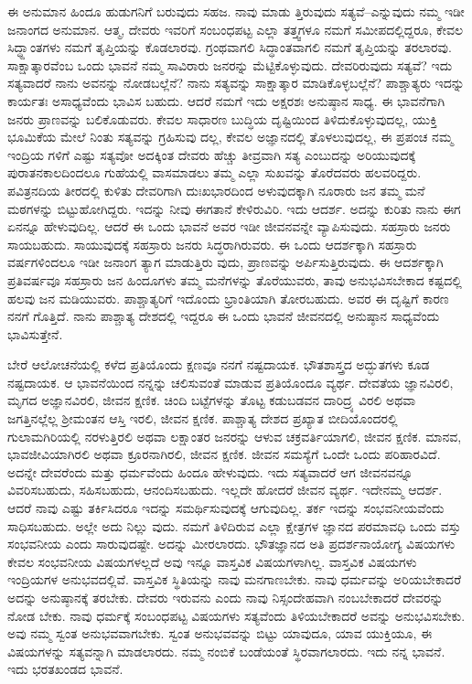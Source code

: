 ಈ ಅನುಮಾನ ಹಿಂದೂ ಹುಡುಗನಿಗೆ ಬರುವುದು ಸಹಜ. ನಾವು ಮಾಡು ತ್ತಿರುವುದು ಸತ್ಯವೆ–ಎನ್ನುವುದು ನಮ್ಮ ಇಡೀ ಜನಾಂಗದ ಅನುಮಾನ. ಆತ್ಮ, ದೇವರು ಇವರಿಗೆ ಸಂಬಂಧಪಟ್ಟ ಎಲ್ಲಾ ತತ್ತ್ವಗಳೂ ನಮಗೆ ಸಮೀಪದಲ್ಲಿದ್ದರೂ, ಕೇವಲ ಸಿದ್ಧ್ದಾಂತಗಳು ನಮಗೆ ತೃಪ್ತಿಯನ್ನು ಕೊಡಲಾರವು. ಗ್ರಂಥವಾಗಲಿ ಸಿದ್ಧಾಂತವಾಗಲಿ ನಮಗೆ ತೃಪ್ತಿಯನ್ನು ತರಲಾರವು. ಸಾಕ್ಷಾತ್ಕಾರವೆಂಬ ಒಂದು ಭಾವನೆ ನಮ್ಮ ಸಾವಿರಾರು ಜನರನ್ನು ಮೆಟ್ಟಿಕೊಳ್ಳುವುದು. ದೇವರಿರುವುದು ಸತ್ಯವೆ? ಇದು ಸತ್ಯವಾದರೆ ನಾನು ಅವನನ್ನು ನೋಡಬಲ್ಲೆನೆ? ನಾನು ಸತ್ಯವನ್ನು ಸಾಕ್ಷಾತ್ಕಾರ ಮಾಡಿಕೊಳ್ಳಬಲ್ಲೆನೆ? ಪಾಶ್ಚಾತ್ಯರು ಇದನ್ನು ಕಾರ್ಯತಃ ಅಸಾಧ್ಯವೆಂದು ಭಾವಿಸ ಬಹುದು. ಆದರೆ ನಮಗೆ ಇದು ಅಕ್ಷರಶಃ ಅನುಷ್ಠಾನ ಸಾಧ್ಯ. ಈ ಭಾವನೆಗಾಗಿ ಜನರು ಪ್ರಾಣವನ್ನು ಬಲಿಕೊಡುವರು. ಕೇವಲ ಸಾಧಾರಣ ಬುದ್ಧಿಯ ದೃಷ್ಟಿಯಿಂದ ತಿಳಿದುಕೊಳ್ಳುವುದಲ್ಲ, ಯುಕ್ತಿ ಭೂಮಿಕೆಯ ಮೇಲೆ ನಿಂತು ಸತ್ಯವನ್ನು ಗ್ರಹಿಸುವು ದಲ್ಲ, ಕೇವಲ ಅಜ್ಞಾನದಲ್ಲಿ ತೊಳಲುವುದಲ್ಲ, ಈ ಪ್ರಪಂಚ ನಮ್ಮ ಇಂದ್ರಿಯ ಗಳಿಗೆ ಎಷ್ಟು ಸತ್ಯವೋ ಅದಕ್ಕಿಂತ ದೇವರು ಹೆಚ್ಚು ತೀವ್ರವಾಗಿ ಸತ್ಯ ಎಂಬುದನ್ನು ಅರಿಯುವುದಕ್ಕೆ ಪುರಾತನಕಾಲದಿಂದಲೂ ಗುಹೆಯಲ್ಲಿ ವಾಸಮಾಡಲು ತಮ್ಮ ಎಲ್ಲಾ ಸುಖವನ್ನು ತೊರೆದವರು ಹಲವರಿದ್ದರು. ಪವಿತ್ರನದಿಯ ತೀರದಲ್ಲಿ ಕುಳಿತು ದೇವರಿಗಾಗಿ ದುಃಖಭಾರದಿಂದ ಅಳುವುದಕ್ಕಾಗಿ ನೂರಾರು ಜನ ತಮ್ಮ ಮನೆ ಮಠಗಳನ್ನು ಬಿಟ್ಟುಹೋಗಿದ್ದರು. ಇದನ್ನು ನೀವು ಈಗತಾನೆ ಕೇಳಿರುವಿರಿ. ಇದು ಆದರ್ಶ. ಅದನ್ನು ಕುರಿತು ನಾನು ಈಗ ಏನನ್ನೂ ಹೇಳುವುದಿಲ್ಲ. ಆದರೆ ಈ ಒಂದು ಭಾವನೆ ಅವರ ಇಡೀ ಜೀವನವನ್ನೇ ವ್ಯಾಪಿಸುವುದು. ಸಹಸ್ರಾರು ಜನರು ಸಾಯಬಹುದು. ಸಾಯುವುದಕ್ಕೆ ಸಹಸ್ರಾರು ಜನರು ಸಿದ್ಧರಾಗಿರುವರು. ಈ ಒಂದು ಆದರ್ಶಕ್ಕಾಗಿ ಸಹಸ್ರಾರು ವರ್ಷಗಳಿಂದಲೂ ಇಡೀ ಜನಾಂಗ ತ್ಯಾಗ ಮಾಡುತ್ತಿರು ವುದು, ಪ್ರಾಣವನ್ನು ಅರ್ಪಿಸುತ್ತಿರುವುದು. ಈ ಆದರ್ಶಕ್ಕಾಗಿ ಪ್ರತಿವರ್ಷವೂ ಸಹಸ್ರಾರು ಜನ ಹಿಂದೂಗಳು ತಮ್ಮ ಮನೆಗಳನ್ನು ತೊರೆಯುವರು, ತಾವು ಅನುಭವಿಸಬೇಕಾದ ಕಷ್ಟದಲ್ಲಿ ಹಲವು ಜನ ಮಡಿಯುವರು. ಪಾಶ್ಚಾತ್ಯರಿಗೆ ಇದೊಂದು ಭ್ರಾಂತಿಯಾಗಿ ತೋರಬಹುದು. ಅವರ ಈ ದೃಷ್ಟಿಗೆ ಕಾರಣ ನನಗೆ ಗೊತ್ತಿದೆ. ನಾನು ಪಾಶ್ಚಾತ್ಯ ದೇಶದಲ್ಲಿ ಇದ್ದರೂ ಈ ಒಂದು ಭಾವನೆ ಜೀವನದಲ್ಲಿ ಅನುಷ್ಠಾನ ಸಾಧ್ಯವೆಂದು ಭಾವಿಸುತ್ತೇನೆ.

ಬೇರೆ ಆಲೋಚನೆಯಲ್ಲಿ ಕಳೆದ ಪ್ರತಿಯೊಂದು ಕ್ಷಣವೂ ನನಗೆ ನಷ್ಟದಾಯಕ. ಭೌತಶಾಸ್ತ್ರದ ಅದ್ಭುತಗಳು ಕೂಡ ನಷ್ಟದಾಯಕ. ಆ ಭಾವನೆಯಿಂದ ನನ್ನನ್ನು ಚಲಿಸುವಂತೆ ಮಾಡುವ ಪ್ರತಿಯೊಂದೂ ವ್ಯರ್ಥ. ದೇವತೆಯ ಜ್ಞಾನವಿರಲಿ, ಮೃಗದ ಅಜ್ಞಾನವಿರಲಿ, ಜೀವನ ಕ್ಷಣಿಕ. ಚಿಂದಿ ಬಟ್ಟೆಗಳನ್ನು ತೊಟ್ಟ ಕಡುಬಡವನ ದಾರಿದ್ರ್ಯ ವಿರಲಿ ಅಥವಾ ಜಗತ್ತಿನಲ್ಲೆಲ್ಲ ಶ‍್ರೀಮಂತನ ಆಸ್ತಿ ಇರಲಿ, ಜೀವನ ಕ್ಷಣಿಕ. ಪಾಶ್ಚಾತ್ಯ ದೇಶದ ಪ್ರಖ್ಯಾತ ಬೀದಿಯೊಂದರಲ್ಲಿ ಗುಲಾಮಗಿರಿಯಲ್ಲಿ ನರಳುತ್ತಿರಲಿ ಅಥವಾ ಲಕ್ಷಾಂತರ ಜನರನ್ನು ಆಳುವ ಚಕ್ರವರ್ತಿಯಾಗಲಿ, ಜೀವನ ಕ್ಷಣಿಕ. ಮಾನವ, ಭಾವಜೀವಿಯಾಗಿರಲಿ ಅಥವಾ ಕ್ರೂರನಾಗಿರಲಿ, ಜೀವನ ಕ್ಷಣಿಕ. ಜೀವನ ಸಮಸ್ಯೆಗೆ ಒಂದೇ ಒಂದು ಪರಿಹಾರವಿದೆ. ಅದನ್ನೇ ದೇವರೆಂದು ಮತ್ತು ಧರ್ಮವೆಂದು ಹಿಂದೂ ಹೇಳುವುದು. ಇದು ಸತ್ಯವಾದರೆ ಆಗ ಜೀವನವನ್ನೂ ವಿವರಿಸಬಹುದು, ಸಹಿಸಬಹುದು, ಆನಂದಿಸಬಹುದು. ಇಲ್ಲದೇ ಹೋದರೆ ಜೀವನ ವ್ಯರ್ಥ. ಇದೇನಮ್ಮ ಆದರ್ಶ. ಆದರೆ ನಾವು ಎಷ್ಟು ತರ್ಕಿಸಿದರೂ ಇದನ್ನು ಸಮರ್ಥಿಸುವುದಕ್ಕೆ ಆಗುವುದಿಲ್ಲ. ತರ್ಕ ಇದನ್ನು ಸಂಭವನೀಯವೆಂದು ಸಾಧಿಸಬಹುದು. ಅಲ್ಲೇ ಅದು ನಿಲ್ಲು ವುದು. ನಮಗೆ ತಿಳಿದಿರುವ ಎಲ್ಲಾ ಕ್ಷೇತ್ರಗಳ ಜ್ಞಾನದ ಪರಮಾವಧಿ ಒಂದು ವಸ್ತು ಸಂಭವನೀಯ ಎಂದು ಸಾರುವುದಷ್ಟೇ. ಅದನ್ನು ಮೀರಲಾರದು. ಭೌತಜ್ಞಾನದ ಅತಿ ಪ್ರದರ್ಶನಾಯೋಗ್ಯ ವಿಷಯಗಳು ಕೇವಲ ಸಂಭವನೀಯ ವಿಷಯಗಳಲ್ಲದೆ ಅವು ಇನ್ನೂ ವಾಸ್ತವಿಕ ವಿಷಯಗಳಾಗಿಲ್ಲ. ವಾಸ್ತವಿಕ ವಿಷಯಗಳು ಇಂದ್ರಿಯಗಳ ಅನುಭವದಲ್ಲಿವೆ. ವಾಸ್ತವಿಕ ಸ್ಥಿತಿಯನ್ನು ನಾವು ಮನಗಾಣಬೇಕು. ನಾವು ಧರ್ಮವನ್ನು ಅರಿಯಬೇಕಾದರೆ ಅದನ್ನು ಅನುಷ್ಠಾನಕ್ಕೆ ತರಬೇಕು. ದೇವರು ಇರುವನು ಎಂದು ನಾವು ನಿಸ್ಸಂದೇಹವಾಗಿ ನಂಬಬೇಕಾದರೆ ದೇವರನ್ನು ನೋಡ ಬೇಕು. ನಾವು ಧರ್ಮಕ್ಕೆ ಸಂಬಂಧಪಟ್ಟ ವಿಷಯಗಳು ಸತ್ಯವೆಂದು ತಿಳಿಯಬೇಕಾದರೆ ಅವನ್ನು ಅನುಭವಿಸಬೇಕು. ಅವು ನಮ್ಮ ಸ್ವಂತ ಅನುಭವವಾಗಬೇಕು. ಸ್ವಂತ ಅನುಭವವನ್ನು ಬಿಟ್ಟು ಯಾವುದೂ, ಯಾವ ಯುಕ್ತಿಯೂ, ಈ ವಿಷಯಗಳನ್ನು ಸತ್ಯವನ್ನಾಗಿ ಮಾಡಲಾರದು. ನಮ್ಮ ನಂಬಿಕೆ ಬಂಡೆಯಂತೆ ಸ್ಥಿರವಾಗಲಾರದು. ಇದು ನನ್ನ ಭಾವನೆ. ಇದು ಭರತಖಂಡದ ಭಾವನೆ.

